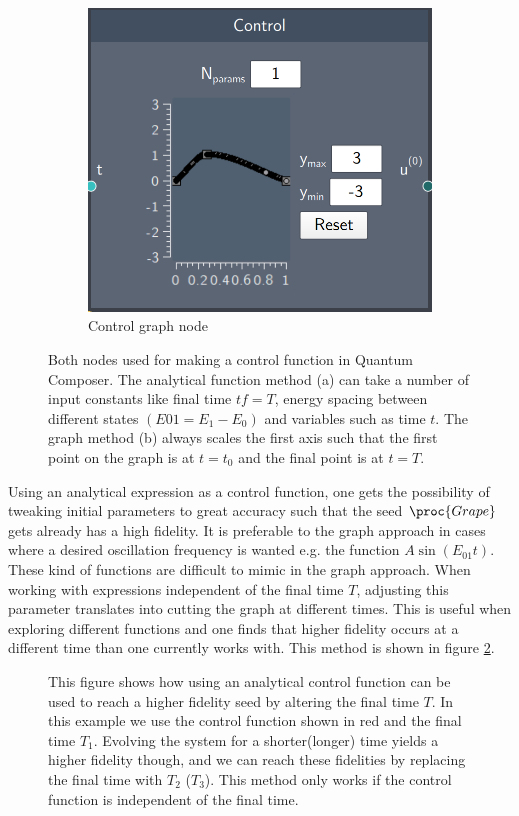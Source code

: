 \documentclass[a4paper, twocolumn]{revtex4-1}
\begin{document}
\begin{figure}[h]
\begin{subfigure}[b]{0.45\columnwidth}
		\includegraphics[width=\columnwidth]{graphics/composerScreens/ControlNode.png}
		\caption{Control graph node}
	\end{subfigure}
	\caption{Both nodes used for making a control function in Quantum Composer. The analytical function method (a) can take a number of input constants like final time $tf = T$, energy spacing between different states $(E01 = E_1 - E_0)$ and variables such as time $t$. The graph method (b) always scales the first axis such that the first point on the graph is at $t=t_0$ and the final point is at $t=T$.}
	\label{fig:Controls}
\end{figure}

Using an analytical expression as a control function, one gets the possibility of tweaking initial parameters to great accuracy such that the seed $\proc{Grape}$ gets already has a high fidelity. It is preferable to the graph approach in cases where a desired oscillation frequency is wanted e.g. the function $A\sin(E_{01}t)$. These kind of functions are difficult to mimic in the graph approach. When working with expressions independent of the final time $T$, adjusting this parameter translates into cutting the graph at different times. This is useful when exploring different functions and one finds that higher fidelity occurs at a different time than one currently works with. This method is shown in figure \ref{fig:funcAppr}. \\
\begin{figure}
	\def\svgwidth{\columnwidth}
	
	\caption{This figure shows how using an analytical control function can be used to reach a higher fidelity seed by altering the final time $T$. In this example we use the control function shown in red and the final time $T_1$. Evolving the system for a shorter(longer) time yields a higher fidelity though, and we can reach these fidelities by replacing the final time with $T_2$ ($T_3$). This method only works if the control function is independent of the final time.}
	\label{fig:funcAppr}
\end{figure}
\end{document}
